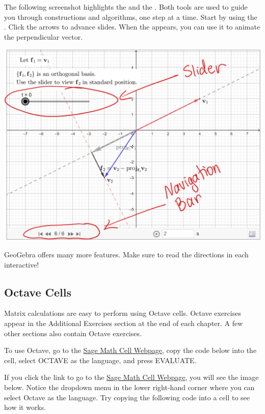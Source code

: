 \documentclass{ximera}
\begin{document}
\begin{center}
\end{center}

The following screenshot highlights the  and the .  Both tools are used to guide you through constructions and algorithms, one step at a time.  Start by using the .  Click the arrows to advance slides.  When the  appears, you can use it to animate the perpendicular vector.
\begin{image}
\includegraphics{GeoGebraScreenshot1.jpg}
\end{image}

\begin{center}
\end{center}
GeoGebra offers many more features.  Make sure to read the directions in each interactive!

\subsection*{Octave Cells}
Matrix calculations are easy to perform using Octave cells.  Octave exercises appear in the Additional Exercises section at the end of each chapter.  A few other sections also contain Octave exercises.%

To use Octave, go to the \href{https://sagecell.sagemath.org/}{Sage Math Cell Webpage}, copy the code below into the cell, select OCTAVE as the language, and press EVALUATE.

If you click the link to go to the \href{https://sagecell.sagemath.org/}{Sage Math Cell Webpage}, you will see the image below.  Notice the dropdown menu in the lower right-hand corner where you can select Octave as the language.  Try copying the following code into a cell to see how it works.
\end{document}
